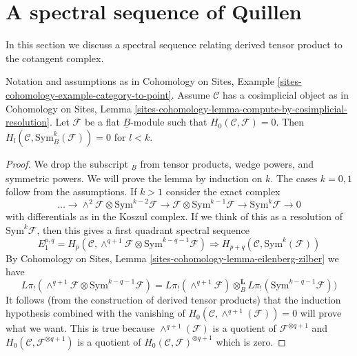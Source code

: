 \section{A spectral sequence of Quillen}
\label{section-spectral-sequence}

\noindent
In this section we discuss a spectral sequence relating derived
tensor product to the cotangent complex.

\begin{lemma}
\label{lemma-vanishing-symmetric-powers}
Notation and assumptions as in
Cohomology on Sites, Example \ref{sites-cohomology-example-category-to-point}.
Assume $\mathcal{C}$ has a cosimplicial object as in
Cohomology on Sites, Lemma
\ref{sites-cohomology-lemma-compute-by-cosimplicial-resolution}.
Let $\mathcal{F}$ be a flat $\underline{B}$-module such that
$H_0(\mathcal{C}, \mathcal{F}) = 0$.
Then $H_l(\mathcal{C}, \text{Sym}_{\underline{B}}^k(\mathcal{F})) = 0$
for $l < k$.
\end{lemma}

\begin{proof}
We drop the subscript ${}_{\underline{B}}$ from tensor products, wedge powers,
and symmetric powers. We will prove the lemma by induction on $k$.
The cases $k = 0, 1$ follow from the assumptions. If $k > 1$ consider
the exact complex
$$
\ldots \to
\wedge^2\mathcal{F} \otimes \text{Sym}^{k - 2}\mathcal{F} \to
\mathcal{F} \otimes \text{Sym}^{k - 1}\mathcal{F} \to
\text{Sym}^k\mathcal{F} \to 0
$$
with differentials as in the Koszul complex. If we think of this as a
resolution of $\text{Sym}^k\mathcal{F}$, then this gives a first quadrant
spectral sequence
$$
E_1^{p, q} =
H_p(\mathcal{C},
\wedge^{q + 1}\mathcal{F} \otimes \text{Sym}^{k - q - 1}\mathcal{F})
\Rightarrow
H_{p + q}(\mathcal{C}, \text{Sym}^k(\mathcal{F}))
$$
By Cohomology on Sites, Lemma \ref{sites-cohomology-lemma-eilenberg-zilber}
we have
$$
L\pi_!(\wedge^{q + 1}\mathcal{F} \otimes \text{Sym}^{k - q - 1}\mathcal{F}) =
L\pi_!(\wedge^{q + 1}\mathcal{F}) \otimes_B^\mathbf{L}
L\pi_!(\text{Sym}^{k - q - 1}\mathcal{F}))
$$
It follows (from the construction of derived tensor products) that
the induction hypothesis combined with the vanishing
of $H_0(\mathcal{C}, \wedge^{q + 1}(\mathcal{F})) = 0$ will prove what we want.
This is true because $\wedge^{q + 1}(\mathcal{F})$ is a quotient
of $\mathcal{F}^{\otimes q + 1}$ and
$H_0(\mathcal{C}, \mathcal{F}^{\otimes q + 1})$
is a quotient of $H_0(\mathcal{C}, \mathcal{F})^{\otimes q + 1}$
which is zero.
\end{proof}

